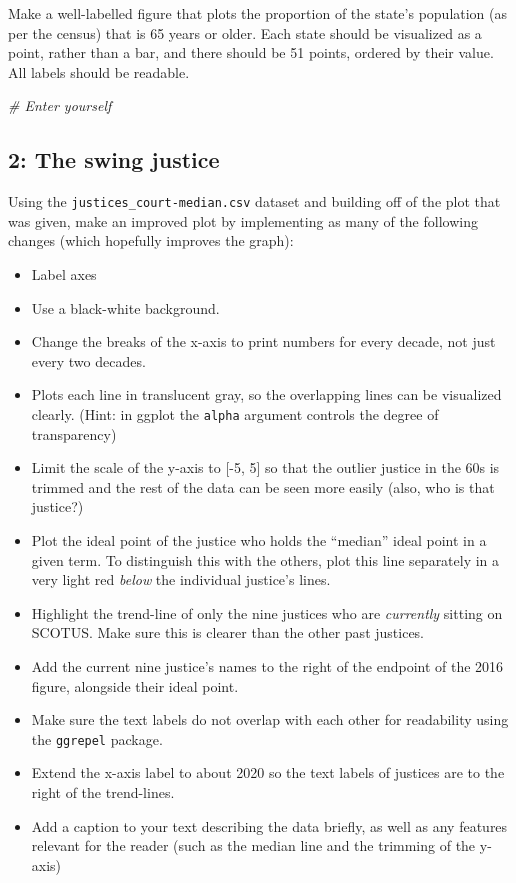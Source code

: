\documentclass[
]{book}
\newenvironment{Shaded}{\begin{snugshade}}{\end{snugshade}}
\newcommand{\CommentTok}[1]{\textcolor[rgb]{0.56,0.35,0.01}{\textit{#1}}}
\providecommand{\tightlist}{%
  \setlength{\itemsep}{0pt}\setlength{\parskip}{0pt}}
\theoremstyle{definition}
\theoremstyle{definition}
\theoremstyle{definition}
\theoremstyle{definition}
\theoremstyle{remark}
\begin{document}
Make a well-labelled figure that plots the proportion of the state's population (as per the census) that is 65 years or older. Each state should be visualized as a point, rather than a bar, and there should be 51 points, ordered by their value. All labels should be readable.

\begin{Shaded}
\begin{Highlighting}[]
\CommentTok{# Enter yourself}
\end{Highlighting}
\end{Shaded}

\hypertarget{the-swing-justice}{%
\subsection*{2: The swing justice}\label{the-swing-justice}}

Using the \texttt{justices\_court-median.csv} dataset and building off of the plot that was given, make an improved plot by implementing as many of the following changes (which hopefully improves the graph):

\begin{itemize}
\tightlist
\item
  Label axes
\item
  Use a black-white background.
\item
  Change the breaks of the x-axis to print numbers for every decade, not just every two decades.
\item
  Plots each line in translucent gray, so the overlapping lines can be visualized clearly. (Hint: in ggplot the \texttt{alpha} argument controls the degree of transparency)
\item
  Limit the scale of the y-axis to {[}-5, 5{]} so that the outlier justice in the 60s is trimmed and the rest of the data can be seen more easily (also, who is that justice?)
\item
  Plot the ideal point of the justice who holds the ``median'' ideal point in a given term. To distinguish this with the others, plot this line separately in a very light red \emph{below} the individual justice's lines.
\item
  Highlight the trend-line of only the nine justices who are \emph{currently} sitting on SCOTUS. Make sure this is clearer than the other past justices.
\item
  Add the current nine justice's names to the right of the endpoint of the 2016 figure, alongside their ideal point.
\item
  Make sure the text labels do not overlap with each other for readability using the \texttt{ggrepel} package.
\item
  Extend the x-axis label to about 2020 so the text labels of justices are to the right of the trend-lines.
\item
  Add a caption to your text describing the data briefly, as well as any features relevant for the reader (such as the median line and the trimming of the y-axis)
\end{itemize}
\end{document}
